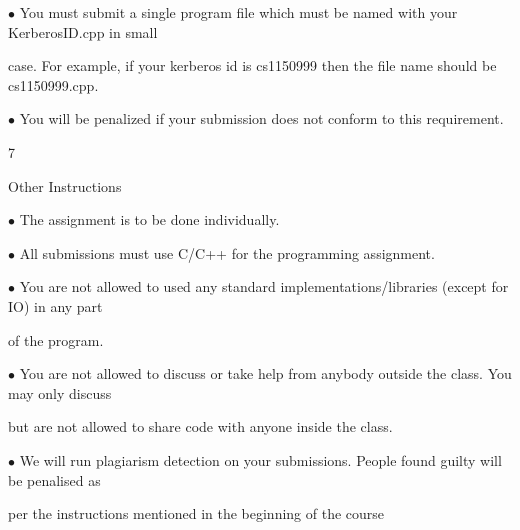 \documentclass[a4paper,portrait,12pt]{article}
\begin{document}
\begin{flushleft}
$\bullet$ You must submit a single program file which must be named with your KerberosID.cpp in small
\end{flushleft}


\begin{flushleft}
case. For example, if your kerberos id is cs1150999 then the file name should be cs1150999.cpp.
\end{flushleft}


\begin{flushleft}
$\bullet$ You will be penalized if your submission does not conform to this requirement.
\end{flushleft}





7





\begin{flushleft}
Other Instructions
\end{flushleft}


\begin{flushleft}
$\bullet$ The assignment is to be done individually.
\end{flushleft}


\begin{flushleft}
$\bullet$ All submissions must use C/C++ for the programming assignment.
\end{flushleft}


\begin{flushleft}
$\bullet$ You are not allowed to used any standard implementations/libraries (except for IO) in any part
\end{flushleft}


\begin{flushleft}
of the program.
\end{flushleft}


\begin{flushleft}
$\bullet$ You are not allowed to discuss or take help from anybody outside the class. You may only discuss
\end{flushleft}


\begin{flushleft}
but are not allowed to share code with anyone inside the class.
\end{flushleft}


\begin{flushleft}
$\bullet$ We will run plagiarism detection on your submissions. People found guilty will be penalised as
\end{flushleft}


\begin{flushleft}
per the instructions mentioned in the beginning of the course
\end{flushleft}





\newpage
\end{document}
